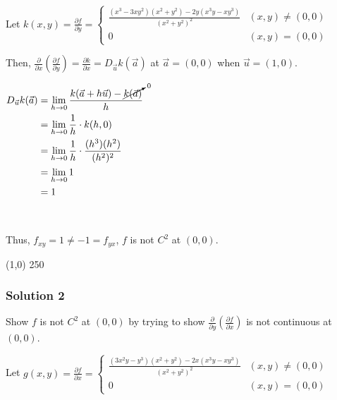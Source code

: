 \documentclass[11pt,fleqn]{book} %
\begin{document}
{~~~}

Let $k(x,y) = \frac{\partial f}{\partial y} =
    \begin{cases}
        \frac{(x^3 - 3xy^2)(x^2 + y^2) - 2y(x^3y - xy^3)}{(x^2 + y^2)^2} & (x,y) \neq (0,0) \\
        0                                                                & (x,y) = (0,0)
    \end{cases}$

Then, $\frac{\partial}{\partial x}\left( \frac{\partial f}{\partial y} \right) = \frac{\partial k}{\partial x} = D_{\vec{u}} k(\vec{a})$ at $\vec{a} = (0,0)$ when $\vec{u} = (1,0)$. 

$\begin{aligned}[t]
    D_{\vec{u}} k(\vec{a}) & = \lim_{h\to0} \frac{k(\vec{a} + h\vec{u}) - \cancelto{0}{k(\vec{a})}}{h} \\
                           & = \lim_{h\to0} \frac{1}{h} \cdot k(h,0)                                   \\
                           & = \lim_{h\to0} \frac{1}{h} \cdot \frac{(h^3)(h^2)}{(h^2)^2}               \\
                           & = \lim_{h\to0} 1                                                          \\
                           & = 1
\end{aligned}$

{~~~}

Thus, $f_{xy} = 1 \neq -1 = f_{yx}$, $f$ is not $C^2$ at $(0,0)$. 

\begin{center} \line(1,0) {250} \end{center}

\subsubsection*{Solution 2}

Show $f$ is not $C^2$ at $(0,0)$ by trying to show $\frac{\partial}{\partial y}\left(\frac{\partial f}{\partial x}\right)$ is not continuous at $(0,0)$. 

Let $g(x,y) = \frac{\partial f}{\partial x} =
    \begin{cases}
        \frac{(3x^2y - y^3)(x^2 + y^2) - 2x(x^3y - xy^3)}{(x^2 + y^2)^2} & (x,y) \neq (0,0) \\
        0                                                                & (x,y) = (0,0)
    \end{cases}$
\end{document}
